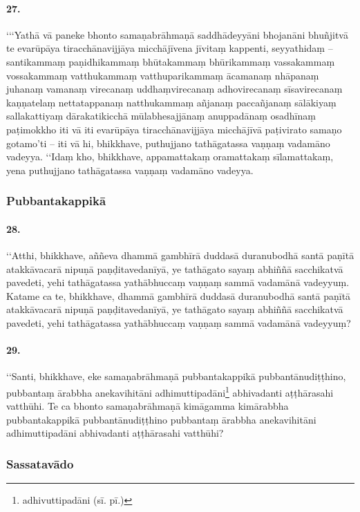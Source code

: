 \paragraph{27.}
‘‘‘Yathā vā paneke bhonto samaṇabrāhmaṇā saddhādeyyāni bhojanāni bhuñjitvā te evarūpāya tiracchānavijjāya micchājīvena jīvitaṃ kappenti, seyyathidaṃ – santikammaṃ paṇidhikammaṃ bhūtakammaṃ bhūrikammaṃ vassakammaṃ vossakammaṃ vatthukammaṃ vatthuparikammaṃ ācamanaṃ nhāpanaṃ juhanaṃ vamanaṃ virecanaṃ uddhaṃvirecanaṃ adhovirecanaṃ sīsavirecanaṃ kaṇṇatelaṃ nettatappanaṃ natthukammaṃ añjanaṃ paccañjanaṃ sālākiyaṃ sallakattiyaṃ dārakatikicchā mūlabhesajjānaṃ anuppadānaṃ osadhīnaṃ paṭimokkho iti vā iti evarūpāya tiracchānavijjāya micchājīvā paṭivirato samaṇo gotamo’ti – iti vā hi, bhikkhave, puthujjano tathāgatassa vaṇṇaṃ vadamāno vadeyya. ‘‘Idaṃ kho, bhikkhave, appamattakaṃ oramattakaṃ sīlamattakaṃ, yena puthujjano tathāgatassa vaṇṇaṃ vadamāno vadeyya.


\subsubsection{Pubbantakappikā}

\paragraph{28.}
‘‘Atthi, bhikkhave, aññeva dhammā gambhīrā duddasā duranubodhā santā paṇītā atakkāvacarā nipuṇā paṇḍitavedanīyā, ye tathāgato sayaṃ abhiññā sacchikatvā pavedeti, yehi tathāgatassa yathābhuccaṃ vaṇṇaṃ sammā vadamānā vadeyyuṃ. Katame ca te, bhikkhave, dhammā gambhīrā duddasā duranubodhā santā paṇītā atakkāvacarā nipuṇā paṇḍitavedanīyā, ye tathāgato sayaṃ abhiññā sacchikatvā pavedeti, yehi tathāgatassa yathābhuccaṃ vaṇṇaṃ sammā vadamānā vadeyyuṃ?

\paragraph{29.}
‘‘Santi, bhikkhave, eke samaṇabrāhmaṇā pubbantakappikā pubbantānudiṭṭhino, pubbantaṃ ārabbha anekavihitāni adhimuttipadāni\footnote{adhivuttipadāni (sī. pī.)} abhivadanti aṭṭhārasahi vatthūhi. Te ca bhonto samaṇabrāhmaṇā kimāgamma kimārabbha pubbantakappikā pubbantānudiṭṭhino pubbantaṃ ārabbha anekavihitāni adhimuttipadāni abhivadanti aṭṭhārasahi vatthūhi?

\subsubsection{Sassatavādo}

